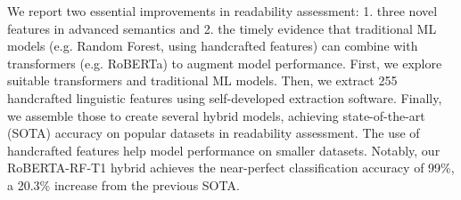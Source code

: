 We report two essential improvements in readability assessment: 1. three novel features in advanced semantics and 2. the timely evidence that traditional ML models (e.g. Random Forest, using handcrafted features) can combine with transformers (e.g. RoBERTa) to augment model performance. First, we explore suitable transformers and traditional ML models. Then, we extract 255 handcrafted linguistic features using self-developed extraction software. Finally, we assemble those to create several hybrid models, achieving state-of-the-art (SOTA) accuracy on popular datasets in readability assessment. The use of handcrafted features help model performance on smaller datasets. Notably, our RoBERTA-RF-T1 hybrid achieves the near-perfect classification accuracy of 99\%, a 20.3\% increase from the previous SOTA.
